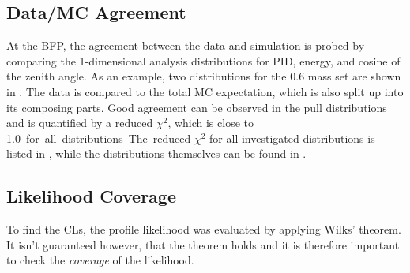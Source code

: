 

\subsection{Data/MC Agreement}

At the BFP, the agreement between the data and simulation is probed by comparing the 1-dimensional analysis distributions for PID, energy, and cosine of the zenith angle. As an example, two distributions for the \SI{0.6}{\gev} mass set are shown in . The data is compared to the total MC expectation, which is also split up into its composing parts. Good agreement can be observed in the pull distributions and is quantified by a reduced $\chi^2$, which is close to \SI{1.0} for all distributions. The reduced $\chi^2$ for all investigated distributions is listed in , while the distributions themselves can be found in .


\subsection{Likelihood Coverage}

To find the CLs, the profile likelihood was evaluated by applying Wilks' theorem. It isn't guaranteed however, that the theorem holds and it is therefore important to check the \textit{coverage} of the likelihood. 
